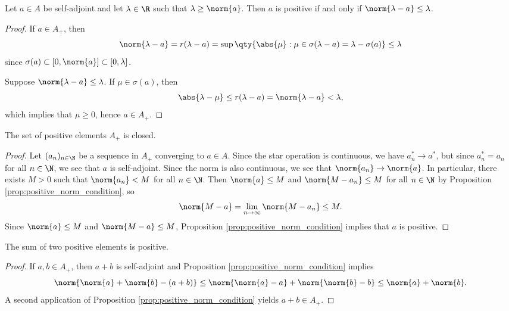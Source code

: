 \begin{proposition}\label{prop:positive_norm_condition}
Let $a \in A$ be self-adjoint and let $\lambda \in \R$ such that $\lambda \geq \norm{a}$. Then $a$ is positive if and only if $\norm{\lambda - a} \leq \lambda$.
\end{proposition}

\begin{proof}
If $a \in A_+$, then 
\begin{equation}
\norm{\lambda - a} = r(\lambda - a) = \sup \qty{\abs{\mu}: \mu \in \sigma(\lambda - a) = \lambda - \sigma(a)} \leq \lambda
\end{equation}
since $\sigma(a) \subset [0,\norm{a}] \subset [0,\lambda]$.

Suppose $\norm{\lambda - a} \leq \lambda$. If $\mu \in \sigma(a)$, then 
\begin{equation}
\abs{\lambda - \mu} \leq  r(\lambda - a) = \norm{\lambda - a} < \lambda,
\end{equation}
which implies that $ \mu \geq 0$, hence $a \in A_+$.
\end{proof}

\begin{proposition}
The set of positive elements $A_+$ is closed.
\end{proposition}

\begin{proof}
Let $(a_n)_{n \in \N}$ be a sequence in $A_+$ converging to $a \in A$. Since the star operation is continuous, we have $a_n^* \rightarrow a^*$, but since $a_n^* = a_n$ for all $n \in \N$, we see that $a$ is self-adjoint. Since  the norm is also continuous, we see that $\norm{a_n} \rightarrow \norm{a}$. In particular, there exists $M > 0$ such that $\norm{a_n} < M$ for all $n \in \N$. Then $\norm{a} \leq M$ and $\norm{M - a_n} \leq M$ for all $n \in \N$ by Proposition \ref{prop:positive_norm_condition}, so 
\begin{equation}
\norm{M - a} = \lim_{n \rightarrow \infty} \norm{M - a_n} \leq M.
\end{equation}
Since $\norm{a} \leq M$ and $\norm{M - a} \leq M$, Proposition \ref{prop:positive_norm_condition} implies that $a$ is positive.
\end{proof}

\begin{proposition}
The sum of two positive elements is positive.
\end{proposition}

\begin{proof}
If $a, b \in A_+$,  then $a+b$ is self-adjoint and Proposition \ref{prop:positive_norm_condition} implies
\begin{equation}
\norm{\norm{a} + \norm{b} - (a + b)} \leq \norm{\norm{a} - a} + \norm{\norm{b} - b} \leq \norm{a} + \norm{b}.
\end{equation}
A second application of Proposition \ref{prop:positive_norm_condition} yields $a + b \in A_+$.
\end{proof}

